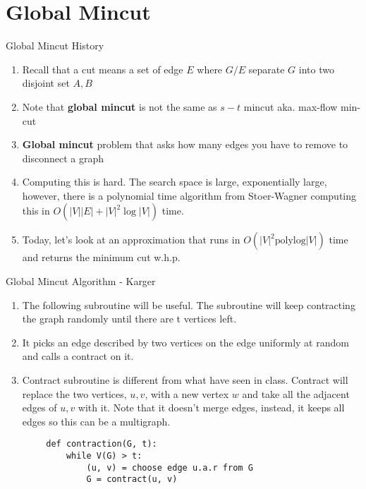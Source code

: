 \section{Global Mincut}

\begin{frame}{Global Mincut History}
    \begin{enumerate}\addtolength{\itemsep}{1em} %
        \item Recall that a cut means a set of edge $E$ where $G / E$ separate $G$ into two disjoint set $A, B$
        \item Note that \textbf{global mincut} is not the same as $s-t$ mincut aka. max-flow min-cut
        \item \textbf{Global mincut} problem that asks how many edges you have to remove to disconnect a graph
        \item Computing this is hard. The search space is large, exponentially large, however, there is a polynomial time algorithm from Stoer-Wagner computing this in $O(|V||E| + |V|^2\log{|V|})$ time.
        \item Today, let's look at an approximation that runs in $O(|V|^2\text{polylog}{|V|})$ time and returns the minimum cut w.h.p.
    \end{enumerate}
\end{frame}

\begin{frame}[fragile]{Global Mincut Algorithm - Karger}
    \begin{enumerate}
        \item The following subroutine will be useful. The subroutine will keep contracting the graph randomly until there are t vertices left.
        \item It picks an edge described by two vertices on the edge uniformly at random and calls a contract on it.
        \item Contract subroutine is different from what have seen in class. Contract will replace the two vertices, $u, v$, with a new vertex $w$ and take all the adjacent edges of $u, v$ with it. Note that it doesn't merge edges, instead, it keeps all edges so this can be a multigraph.
    \end{enumerate}
    \begin{verbatim}
        def contraction(G, t):
            while V(G) > t:
                (u, v) = choose edge u.a.r from G
                G = contract(u, v)
    \end{verbatim}
\end{frame}

